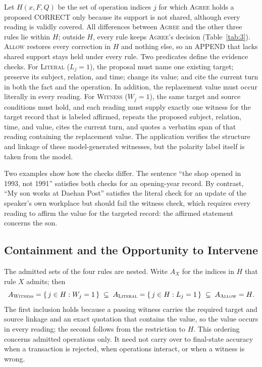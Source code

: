 \documentclass[acmsmall,review,anonymous]{acmart}
\newcommand{\agree}{\textsc{Agree}}
\newcommand{\allow}{\textsc{Allow}}
\newcommand{\literal}{\textsc{Literal}}
\newcommand{\witness}{\textsc{Witness}}
\newcommand{\rulesub}[1]{\text{\textsc{#1}}}
\begin{document}
Let $H(x,F,Q)$ be the set of operation indices $j$ for which \agree{} holds a proposed CORRECT only because its support is not shared, although every reading is validly covered. All differences between \agree{} and the other three rules lie within $H$; outside $H$, every rule keeps \agree{}'s decision (Table~\ref{tab:3}). \allow{} restores every correction in $H$ and nothing else, so an APPEND that lacks shared support stays held under every rule. Two predicates define the evidence checks. For \literal{} ($L_j=1$), the proposal must name one existing target; preserve its subject, relation, and time; change its value; and cite the current turn in both the fact and the operation. In addition, the replacement value must occur literally in every reading. For \witness{} ($W_j=1$), the same target and source conditions must hold, and each reading must supply exactly one witness for the target record that is labeled affirmed, repeats the proposed subject, relation, time, and value, cites the current turn, and quotes a verbatim span of that reading containing the replacement value. The application verifies the structure and linkage of these model-generated witnesses, but the polarity label itself is taken from the model.

Two examples show how the checks differ. The sentence ``the shop opened in 1993, not 1991'' satisfies both checks for an opening-year record. By contrast, ``My son works at Daehan Post'' satisfies the literal check for an update of the speaker's own workplace but should fail the witness check, which requires every reading to affirm the value for the targeted record: the affirmed statement concerns the son.

\subsection{Containment and the Opportunity to Intervene}\label{sec:bound}
The admitted sets of the four rules are nested. Write $A_X$ for the indices in $H$ that rule $X$ admits; then
\begin{equation}
A_{\rulesub{Witness}}=\{\,j\in H : W_j=1\,\}\;\subseteq\; A_{\rulesub{Literal}}=\{\,j\in H : L_j=1\,\}\;\subseteq\; A_{\rulesub{Allow}}=H .
\label{eq:containment}
\end{equation}
The first inclusion holds because a passing witness carries the required target and source linkage and an exact quotation that contains the value, so the value occurs in every reading; the second follows from the restriction to $H$. This ordering concerns admitted operations only. It need not carry over to final-state accuracy when a transaction is rejected, when operations interact, or when a witness is wrong.
\end{document}
